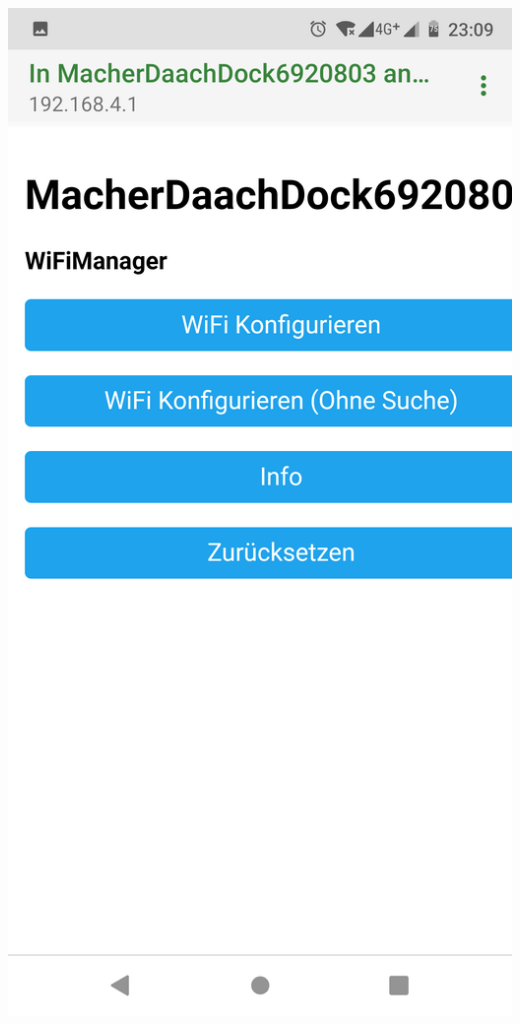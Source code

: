 \documentclass{article}
\begin{document}
\vspace{0.5cm}

\begin{minipage}[b]{0.5\textwidth}
	\includegraphics[width=\textwidth]{Bilder2019/Screenshot_20190918-230936_CaptivePortalLogin.png}
\end{minipage}
\end{document}
